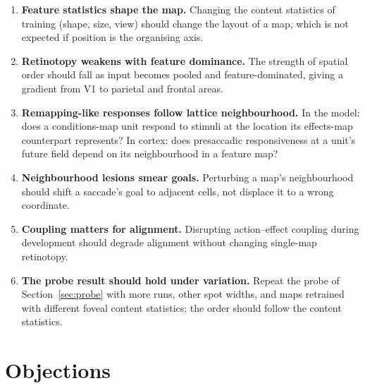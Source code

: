 \documentclass[11pt,a4paper]{article}
\begin{document}
\begin{enumerate}[nosep]
  \item \textbf{Feature statistics shape the map.} Changing the content statistics
    of training (shape, size, view) should change the layout of a map, which is not
    expected if position is the organising axis.
  \item \textbf{Retinotopy weakens with feature dominance.} The strength of spatial
    order should fall as input becomes pooled and feature-dominated, giving a
    gradient from V1 to parietal and frontal areas.
  \item \textbf{Remapping-like responses follow lattice neighbourhood.} In the
    model: does a conditions-map unit respond to stimuli at the location its effects-map
    counterpart represents? In cortex: does presaccadic responsiveness at a unit's
    future field depend on its neighbourhood in a feature map?
  \item \textbf{Neighbourhood lesions smear goals.} Perturbing a map's neighbourhood
    should shift a saccade's goal to adjacent cells, not displace it to a wrong
    coordinate.
  \item \textbf{Coupling matters for alignment.} Disrupting action--effect
    coupling during development should degrade alignment without changing
    single-map retinotopy.
  \item \textbf{The probe result should hold under variation.} Repeat the probe of
    Section~\ref{sec:probe} with more runs, other spot widths, and maps retrained with
    different foveal content statistics; the order should follow the content
    statistics.
\end{enumerate}

\section{Objections}
\end{document}
